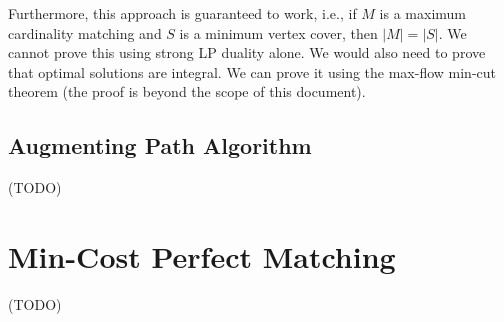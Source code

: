 \documentclass[a4paper,12pt,fleqn]{article}
\begin{document}
Furthermore, this approach is guaranteed to work, i.e.,
if $M$ is a maximum cardinality matching and $S$ is a minimum vertex cover, then $|M| = |S|$.
We cannot prove this using strong LP duality alone.
We would also need to prove that optimal solutions are integral.
We can prove it using the max-flow min-cut theorem
(the proof is beyond the scope of this document).

\subsection{Augmenting Path Algorithm}

(TODO)

\section{Min-Cost Perfect Matching}

(TODO)

%
%
\end{document}
